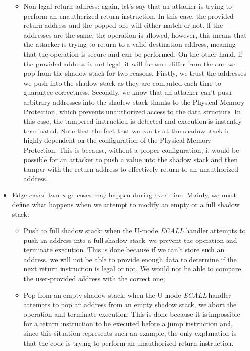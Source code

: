 \begin{itemize}
\begin{itemize}
      \item Non-legal return address: again, let's say that an attacker is trying
        to perform an unauthorized return instruction. In this case, the provided
        return address and the popped one will either match or not. If the
        addresses are the same, the operation is allowed, however, this means that
        the attacker is trying to return to a valid destination address, meaning
        that the operation is secure and can be performed. On the other hand, if
        the provided address is not legal, it will for sure differ from the one we
        pop from the shadow stack for two reasons. Firstly, we trust the addresses
        we push into the shadow stack as they are computed each time to guarantee
        correctness. Secondly, we know that an attacker can't push arbitrary addresses
        into the shadow stack thanks to the Physical Memory Protection, which
        prevents unauthorized access to the data structure. In this case, the
        tampered instruction is detected and execution is instantly terminated. Note
        that the fact that we can trust the shadow stack is highly dependent on the
        configuration of the Physical Memory Protection. This is because, without
        a proper configuration, it would be possible for an attacker to push a
        value into the shadow stack and then tamper with the return address to
        effectively return to an unauthorized address.
    \end{itemize}

  \item Edge cases: two edge cases may happen during execution. Mainly, we must
    define what happens when we attempt to modify an empty or a full shadow
    stack:
    \begin{itemize}
      \item Push to full shadow stack: when the U-mode \textit{ECALL} handler attempts
        to push an address into a full shadow stack, we prevent the operation
        and terminate execution. This is done because if we can't store such an address,
        we will not be able to provide enough data to determine if the next
        return instruction is legal or not. We would not be able to compare the user-provided
        address with the correct one;

      \item Pop from an empty shadow stack: when the U-mode \textit{ECALL} handler
        attempts to pop an address from an empty shadow stack, we abort the
        operation and terminate execution. This is done because it is impossible
        for a return instruction to be executed before a jump instruction and,
        since this situation represents such an example, the only explanation is
        that the code is trying to perform an unauthorized return instruction.
    \end{itemize}
\end{itemize}

